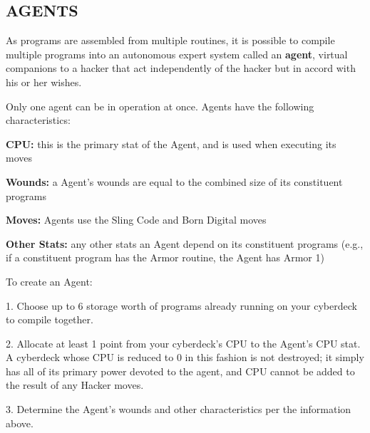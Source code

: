 \documentclass[oneside,10pt]{article}
\begin{document}
\begin{multicols}{2}
\subsection{AGENTS}
As programs are assembled from multiple routines, it is possible to compile multiple programs into an autonomous expert system called an \textbf{agent}, virtual companions to a hacker
that act independently of the hacker but in accord with his or
her wishes.

Only one agent can be in operation at once. Agents have the
following characteristics:
\begin{dent}

\textbf{CPU:} this is the primary stat of the Agent, and is used
when executing its moves

\textbf{Wounds:} a Agent’s wounds are equal to the combined
size of its constituent programs

\textbf{Moves:} Agents use the Sling Code and Born Digital moves

\textbf{Other Stats:} any other stats an Agent depend on its constituent programs (e.g., if a constituent program has the
Armor routine, the Agent has Armor 1)
\end{dent}
To create an Agent:
\begin{dent}

1.	Choose up to 6 storage worth of programs already running on your cyberdeck to compile together.

2.	Allocate at least 1 point from your cyberdeck’s CPU to
the Agent’s CPU stat. A cyberdeck whose CPU is reduced to 0 in this fashion is not destroyed; it simply has
all of its primary power devoted to the agent, and CPU
cannot be added to the result of any Hacker moves.

3.	Determine the Agent’s wounds and other characteristics per the information above.
\end{dent}
\end{multicols}

\end{document}
